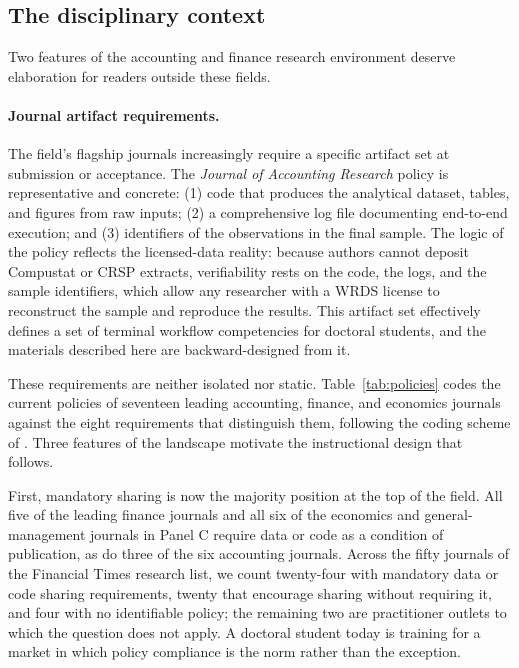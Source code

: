 \documentclass[12pt]{article}
\begin{document}
\subsection{The disciplinary context}

Two features of the accounting and finance research environment deserve
elaboration for readers outside these fields.

\paragraph{Journal artifact requirements.}
The field's flagship journals increasingly require a specific artifact
set at submission or acceptance. The \textit{Journal of Accounting
Research} policy \citep{JARpolicy} is representative and concrete: (1)
code that produces the analytical dataset, tables, and figures from raw
inputs; (2) a comprehensive log file documenting end-to-end execution;
and (3) identifiers of the observations in the final sample. The logic of
the policy reflects the licensed-data reality: because authors cannot
deposit Compustat or CRSP extracts, verifiability rests on the code, the
logs, and the sample identifiers, which allow any researcher with a WRDS
license to reconstruct the sample and reproduce the results. This
artifact set effectively defines a set of terminal workflow competencies
for doctoral students, and the materials described here are
backward-designed from it.

These requirements are neither isolated nor static.
Table~\ref{tab:policies} codes the current policies of seventeen leading
accounting, finance, and economics journals against the eight
requirements that distinguish them, following the coding scheme of
\citet{barrios2026mandated}. Three features of the landscape motivate the
instructional design that follows.

First, mandatory sharing is now the majority position at the top of the
field. All five of the leading finance journals and all six of the
economics and general-management journals in Panel C require data or code
as a condition of publication, as do three of the six accounting
journals. Across the fifty journals of the Financial Times research list,
we count twenty-four with mandatory data or code sharing requirements,
twenty that encourage sharing without requiring it, and four with no
identifiable policy; the remaining two are practitioner outlets to which
the question does not apply. A doctoral student today is training for a
market in which policy compliance is the norm rather than the exception.
\end{document}
